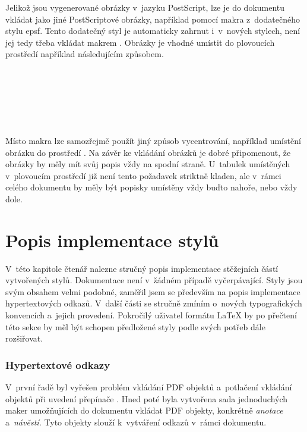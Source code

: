 \documentclass[12pt]{article}
\begin{document}
Jelikož jsou vygenerované obrázky v~jazyku PostScript, lze je do dokumentu
vkládat jako jiné PostScriptové obrázky, 
například pomocí makra 
z~dodatečného stylu \mbox{\textsf{epsf}}. Tento dodatečný styl je automaticky
zahrnut i~v~nových stylech, není jej tedy třeba vkládat makrem
. Obrázky je vhodné umístit do plovoucích prostředí
například následujícím způsobem.

\begin{flushleft}
   \\
   \\
   \\
   \\
   \\
\end{flushleft}

Místo makra  lze samozřejmě použít jiný způsob 
vycentrování, například umístění obrázku do prostředí .
Na závěr ke vkládání obrázků je dobré připomenout, že obrázky by měly mít
svůj popis vždy na spodní straně. U~tabulek umístěných 
v~plovoucím prostředí
již není tento požadavek striktně kladen,
ale v~rámci celého dokumentu by měly být popisky umístěny vždy buďto nahoře,
nebo vždy dole.

\section{Popis implementace stylů}\label{styimpl}
V~této kapitole čtenář nalezne stručný popis implementace stěžejních částí
vytvořených stylů. 
Dokumentace není v~žádném případě vyčerpávající. Styly jsou svým obsahem
velmi podobné, zaměřil jsem se především na popis implementace hypertextových
odkazů. V~další části se stručně zmíním o~nových typografických konvencích
a~jejich provedení. Pokročilý uživatel formátu \LaTeX{} by po přečtení této
sekce by měl být schopen předložené styly podle svých potřeb dále rozšiřovat.

\subsubsection*{Hypertextové odkazy}
V~první řadě byl vyřešen problém vkládání PDF objektů a~potlačení vkládání
objektů při uvedení přepínače .
Hned poté byla vytvořena sada jednoduchých maker umožňujících do dokumentu
vkládat PDF objekty, konkrétně \emph{anotace}
a~\emph{návěstí.}
Tyto objekty slouží k~vytváření odkazů v~rámci dokumentu. 
\end{document}
